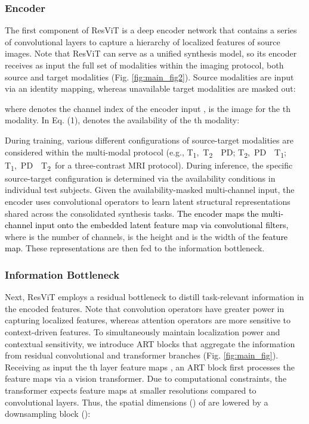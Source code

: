 \documentclass[journal,twoside,web]{ieeecolor}
\newcommand{\TtwoPDTone}{T\textsubscript{2},~PD~~T\textsubscript{1}}
\newcommand{\TonePDTtwo}{T\textsubscript{1},~PD~~T\textsubscript{2}}
\newcommand{\ToneTtwoPD}{T\textsubscript{1},~T\textsubscript{2}~~PD}
\newcommand*{\revhl}{\textcolor{black}}
\begin{document}
\subsubsection{Encoder} The first component of ResViT is a deep encoder network that contains a series of convolutional layers to capture a hierarchy of localized features of source images. Note that ResViT can serve as a unified synthesis model, so its encoder receives as input the full set of modalities within the imaging protocol, both source and target modalities (Fig. \ref{fig:main_fig2}). Source modalities are input via an identity mapping, whereas unavailable target modalities are masked out:
\revhl{

}
where  denotes the channel index of the encoder input ,  is the image for the th modality. In Eq. (1),  denotes the availability of the th modality:

During training, various different configurations of source-target modalities are considered within the multi-modal protocol (e.g., \ToneTtwoPD; \TtwoPDTone; \TonePDTtwo~for a three-contrast MRI protocol). During inference, the specific source-target configuration is determined via the availability conditions in individual test subjects. Given the availability-masked multi-channel input, the encoder uses convolutional operators to learn latent structural representations shared across the consolidated synthesis tasks. \revhl{The encoder maps the multi-channel input  onto the embedded latent feature map  via convolutional filters,}
where  is the number of channels,  is the height and  is the width of the \revhl{feature map}. These representations are then fed to the information bottleneck.  


\subsubsection{Information Bottleneck} Next, ResViT employs a residual bottleneck to distill task-relevant information in the encoded features. Note that convolution operators have greater power in capturing localized features, whereas attention operators are more sensitive to context-driven features. To simultaneously maintain localization power and contextual sensitivity, we introduce ART blocks that aggregate the information from residual convolutional and transformer branches (Fig. \ref{fig:main_fig}). Receiving as input the th layer feature maps , an ART block first processes the feature maps via a vision transformer. Due to computational constraints, the transformer expects feature maps at smaller resolutions compared to convolutional layers. Thus, the spatial dimensions () of  are lowered by a downsampling block ():
\end{document}
